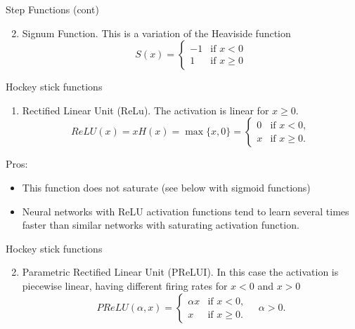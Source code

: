 \documentclass{beamer}
\begin{document}
\begin{frame}{Step Functions (cont)}
	\begin{enumerate}
		\setcounter{enumi}{1}
		\item Signum Function. This is a variation of the Heaviside function
		\begin{equation*}
			S(x)= \begin{cases}
				-1 & \text{if } x <0 \\
				1 & \text{if } x \ge 0
			\end{cases}
		\end{equation*}
	\end{enumerate}
\end{frame}

\begin{frame}{Hockey stick functions}
	\begin{enumerate}
		\item Rectified Linear Unit (ReLu). The activation is linear for $x\ge 0$.
		\begin{equation*}
			ReLU(x)= x H(x)= \max \{ x, 0\} = \begin{cases}
				0 & \text{if } x <0,\\
				x & \text{if } x \ge 0.
			\end{cases}
		\end{equation*}
	\end{enumerate}
Pros:
\begin{itemize}
	\item This function does not saturate (see below with sigmoid functions)
	\item Neural networks with ReLU activation functions tend to learn several times faster than similar networks with saturating activation function.
\end{itemize}

\end{frame}

\begin{frame}{Hockey stick functions}
	\begin{enumerate}
				\setcounter{enumi}{1}
		\item Parametric Rectified Linear Unit (PReLUI). In this case the activation is piecewise linear, having different firing rates for $x<0$ and $x>0$
		\begin{equation*}
	PReLU(\alpha, x)=  \begin{cases}
		\alpha x & \text{if } x <0,\\
		x & \text{if } x \ge 0.
	\end{cases} \quad \alpha >0.
\end{equation*}		
	
	\end{enumerate}
\end{frame}
\end{document}
